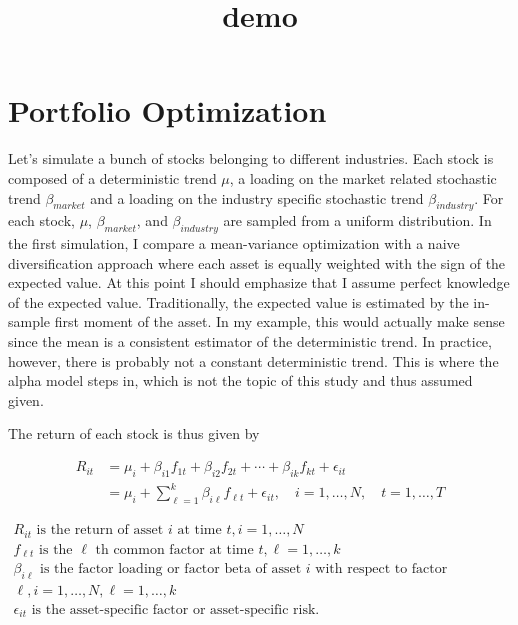 \documentclass[11pt]{article}
\title{demo}
\begin{document}
    
    
    \maketitle
    
    

    
    \hypertarget{portfolio-optimization}{%
\section{Portfolio Optimization}\label{portfolio-optimization}}

    Let's simulate a bunch of stocks belonging to different industries. Each
stock is composed of a deterministic trend \(\mu\), a loading on the
market related stochastic trend \(\beta_{market}\) and a loading on the
industry specific stochastic trend \(\beta_{industry}\). For each stock,
\(\mu\), \(\beta_{market}\), and \(\beta_{industry}\) are sampled from a
uniform distribution. In the first simulation, I compare a mean-variance
optimization with a naive diversification approach where each asset is
equally weighted with the sign of the expected value. At this point I
should emphasize that I assume perfect knowledge of the expected value.
Traditionally, the expected value is estimated by the in-sample first
moment of the asset. In my example, this would actually make sense since
the mean is a consistent estimator of the deterministic trend. In
practice, however, there is probably not a constant deterministic trend.
This is where the alpha model steps in, which is not the topic of this
study and thus assumed given.

The return of each stock is thus given by

\[\begin{aligned} R_{i t} &=\mu_{i}+\beta_{i 1} f_{1 t}+\beta_{i 2} f_{2 t}+\cdots+\beta_{i k} f_{k t}+\epsilon_{i t} \\ &=\mu_{i}+\sum_{\ell=1}^{k} \beta_{i \ell} f_{\ell t}+\epsilon_{i t}, \quad i=1, \ldots, N, \quad t=1, \ldots, T \end{aligned}\]

\(\begin{array}{l}{R_{i t} \text { is the return of asset } i \text { at time } t, i=1, \ldots, N} \\ {f_{\ell t} \text { is the } \ell \text { th common factor at time } t, \ell=1, \ldots, k} \\ {\beta_{i \ell} \text { is the factor loading or factor beta of asset } i \text { with respect to factor }} \\ {\ell, i=1, \ldots, N, \ell=1, \ldots, k} \\ {\epsilon_{i t} \text { is the asset-specific factor or asset-specific risk. }}\end{array}\)
\end{document}
